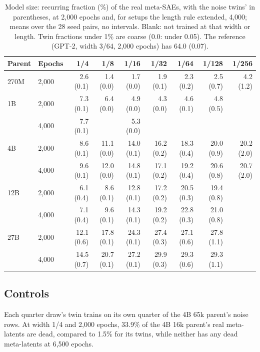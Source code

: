 \begin{table}[!htbp]
  \caption{Model size: recurring fraction (\%) of the real meta-SAEs, with the noise twins' in parentheses, at 2,000 epochs and, for setups the length rule extended, 4,000; means over the 28 seed pairs, no intervals. Blank: not trained at that width or length. Twin fractions under 1\% are coarse (0.0: under 0.05). The reference (GPT-2, width 3/64, 2,000 epochs) has 64.0 (0.07).}
  \label{tab:app-recurring}
  \centering
  \small
  \setlength{\tabcolsep}{4pt}
  \begin{tabular}{@{}llrrrrrrr@{}}
    \toprule
    Parent & Epochs & 1/4 & 1/8 & 1/16 & 1/32 & 1/64 & 1/128 & 1/256 \\
    \midrule
    270M & 2,000 & 2.6 (0.1) & 1.4 (0.0) & 1.7 (0.0) & 1.9 (0.1) & 2.3 (0.2) & 2.5 (0.7) & 4.2 (1.2) \\
    1B & 2,000 & 7.3 (0.1) & 6.4 (0.0) & 4.9 (0.0) & 4.3 (0.0) & 4.6 (0.1) & 4.8 (0.5) & \\
    & 4,000 & 7.7 (0.1) & & 5.3 (0.0) & & & & \\
    4B & 2,000 & 8.6 (0.1) & 11.1 (0.0) & 14.0 (0.1) & 16.2 (0.2) & 18.3 (0.4) & 20.0 (0.9) & 20.2 (2.0) \\
    & 4,000 & 9.6 (0.1) & 12.0 (0.0) & 14.8 (0.1) & 17.1 (0.2) & 19.2 (0.4) & 20.6 (0.8) & 20.7 (2.0) \\
    12B & 2,000 & 6.1 (0.4) & 8.6 (0.1) & 12.8 (0.1) & 17.2 (0.2) & 20.5 (0.3) & 19.4 (0.8) & \\
    & 4,000 & 7.1 (0.4) & 9.6 (0.1) & 14.3 (0.1) & 19.2 (0.2) & 22.8 (0.3) & 21.0 (0.8) & \\
    27B & 2,000 & 12.1 (0.6) & 17.8 (0.1) & 24.3 (0.1) & 27.4 (0.3) & 27.1 (0.6) & 27.8 (1.1) & \\
    & 4,000 & 14.5 (0.7) & 20.7 (0.1) & 27.2 (0.1) & 29.9 (0.3) & 29.3 (0.6) & 29.3 (1.1) & \\
    \bottomrule
  \end{tabular}
\end{table}

\subsection{Controls}
Each quarter draw's twin trains on its own quarter of the 4B 65k parent's noise rows.
At width 1/4 and 2,000 epochs, 33.9\% of the 4B 16k parent's real meta-latents are dead, compared to 1.5\% for its twins, while neither has any dead meta-latents at 6,500 epochs.

